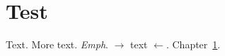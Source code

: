 \documentclass{article}
\newcommand{\custom}[1]{$\rightarrow$ #1 $\leftarrow$}
\begin{document}
\section{Test}
\label{ch:label}

Text. %
%
More text. %
\emph{Emph}. %
\custom{text}. %
Chapter~\ref{ch:label}. %
\end{document}
